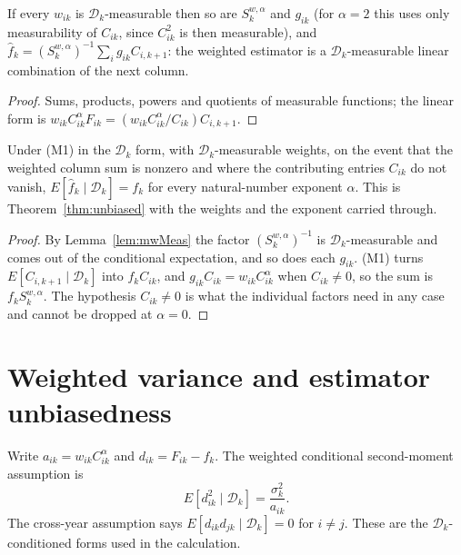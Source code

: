 \begin{lemma}\label{lem:mwMeas}\leanok
{}
If every $w_{ik}$ is $\mathcal{D}_k$-measurable then so are $S_k^{w,\alpha}$ and $g_{ik}$
(for $\alpha = 2$ this uses only measurability of $C_{ik}$, since $C_{ik}^2$ is then
measurable), and
$\hat f_k = (S_k^{w,\alpha})^{-1}\sum_i g_{ik} C_{i,k+1}$: the weighted estimator is a
$\mathcal{D}_k$-measurable linear combination of the next column.
\end{lemma}
\begin{proof}\leanok Sums, products, powers and quotients of measurable functions; the linear
form is $w_{ik}C_{ik}^{\alpha}F_{ik} = (w_{ik}C_{ik}^{\alpha}/C_{ik})C_{i,k+1}$. \end{proof}

\begin{theorem}\label{thm:mwUnbiased}\leanok
{}
Under (M1) in the $\mathcal{D}_k$ form, with $\mathcal{D}_k$-measurable weights, on the event
that the weighted column sum is nonzero and where the contributing entries $C_{ik}$ do not
vanish, $E[\hat f_k \mid \mathcal{D}_k] = f_k$ for every natural-number exponent $\alpha$. This is
Theorem~\ref{thm:unbiased} with the weights and the exponent carried through.
\end{theorem}
\begin{proof}\leanok
By Lemma~\ref{lem:mwMeas} the factor $(S_k^{w,\alpha})^{-1}$ is $\mathcal{D}_k$-measurable and
comes out of the conditional expectation, and so does each $g_{ik}$. (M1) turns
$E[C_{i,k+1}\mid\mathcal{D}_k]$ into $f_k C_{ik}$, and $g_{ik}C_{ik} = w_{ik}C_{ik}^{\alpha}$
when $C_{ik} \neq 0$, so the sum is $f_k S_k^{w,\alpha}$. The hypothesis $C_{ik}\neq 0$ is what
the individual factors need in any case and cannot be dropped at $\alpha = 0$.
\end{proof}

\section{Weighted variance and estimator unbiasedness}

\begin{definition}\label{def:mwVarianceAssumptions}\leanok
{}
Write $a_{ik}=w_{ik}C_{ik}^{\alpha}$ and $d_{ik}=F_{ik}-f_k$. The weighted
conditional second-moment assumption is
\[
  E[d_{ik}^2\mid\mathcal D_k]=\frac{\sigma_k^2}{a_{ik}}.
\]
The cross-year assumption says $E[d_{ik}d_{jk}\mid\mathcal D_k]=0$ for $i\ne j$.
These are the $\mathcal D_k$-conditioned forms used in the calculation.
\end{definition}


